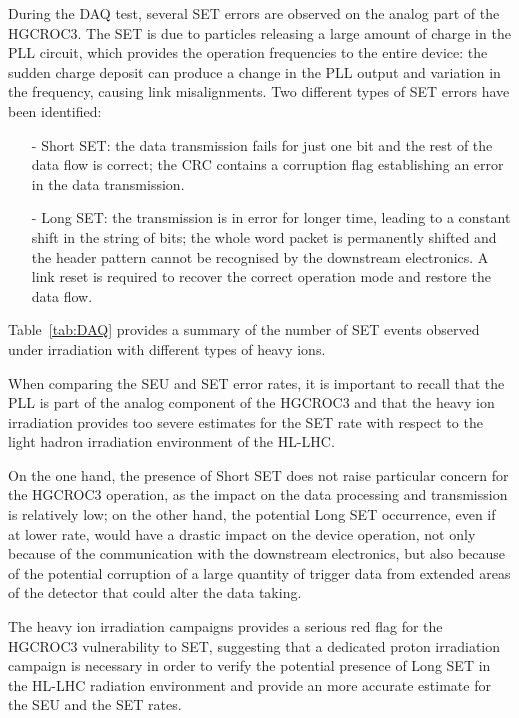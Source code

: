 \bigbreak

During the DAQ test, several SET errors are observed on the analog part of the HGCROC3. The SET is due to particles releasing a large amount of charge in the PLL circuit, which provides the operation frequencies to the entire device: the sudden charge deposit can produce a change in the PLL output and variation in the frequency, causing link misalignments.
Two different types of SET errors have been identified:
\begin{itemize}
    \item [-] Short SET: the data transmission fails for just one bit and the rest of the data flow is correct; the CRC contains a corruption flag establishing an error in the data transmission.
    \item [-] Long SET: the transmission is in error for longer time, leading to a constant shift in the string of bits; the whole word packet is permanently shifted and the header pattern cannot be recognised by the downstream electronics. A link reset is required to recover the correct operation mode and restore the data flow.
\end{itemize}

Table~\ref{tab:DAQ} provides a summary of the number of SET events observed under irradiation with different types of heavy ions. 

\bigbreak

When comparing the SEU and SET error rates, it is important to recall that the PLL is part of the analog component of the HGCROC3 and that the heavy ion irradiation provides too severe estimates for the SET rate with respect to the light hadron irradiation environment of the HL-LHC.

On the one hand, the presence of Short SET does not raise particular concern for the HGCROC3 operation, as the impact on the data processing and transmission is relatively low; on the other hand, the potential Long SET occurrence, even if at lower rate, would have a drastic impact on the device operation, not only because of the communication with the downstream electronics, but also because of the potential corruption of a large quantity of trigger data from extended areas of the detector that could alter the data taking.

The heavy ion irradiation campaigns provides a serious red flag for the HGCROC3 vulnerability to SET, suggesting that a dedicated proton irradiation campaign is necessary in order to verify the potential presence of Long SET in the HL-LHC radiation environment and provide an more accurate estimate for the SEU and the SET rates. 

